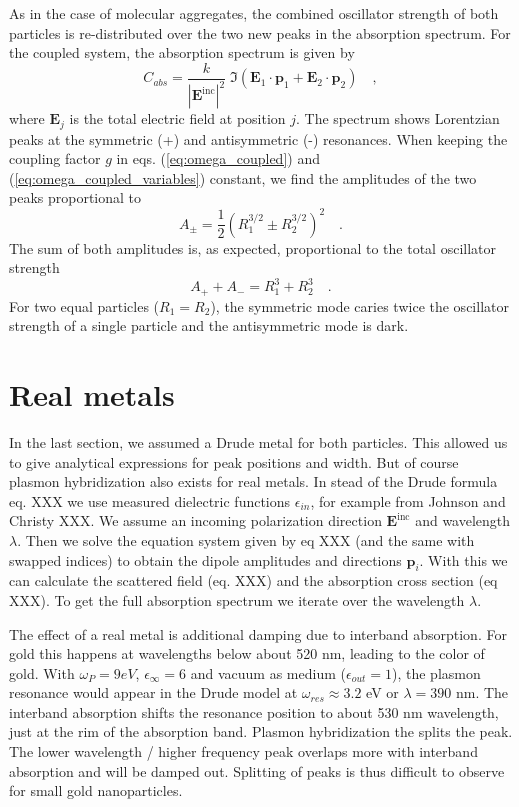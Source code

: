 As in the case of molecular aggregates, the combined oscillator strength of both particles is re-distributed over the two new peaks in the absorption spectrum. 
For
the coupled system, the absorption spectrum is given by  
%
\begin{equation} 
 C_{abs} =  \frac{k}{|\mathbf{E}^{\text{inc}}|^2} \; \Im (\mathbf{E}_1 \cdot \mathbf{p}_1 + \mathbf{E}_2 \cdot \mathbf{p}_2) \quad ,
\end{equation}
%
where $\mathbf{E}_j$ is the total electric field at position $j$. The spectrum shows  Lorentzian
peaks at the symmetric (+) and antisymmetric (-) resonances.  When  keeping the coupling factor $g$ in eqs. (\ref{eq:omega_coupled}) and (\ref{eq:omega_coupled_variables})
constant, we find the  amplitudes of
the two peaks  proportional to 
%
\begin{equation} 
 A_\pm = \frac{1}{2} \left( R_1^{3/2} \pm R_2^{3/2} \right)^2 \quad .
\end{equation}
%
The sum of both amplitudes is, as expected, proportional to the total oscillator
strength
%
\begin{equation} 
 A_+ + A_- = R_1^3 + R_2^3 \quad .
\end{equation}
%
For two equal particles ($R_1 = R_2$), the symmetric mode caries twice the
oscillator strength of a single  particle and the antisymmetric mode
is dark. 


\section{Real metals}

In the last section, we assumed a Drude metal for both particles. This allowed us to give analytical expressions for peak positions and width. But of course plasmon hybridization also exists for real metals. In stead of the Drude formula eq. XXX we use measured dielectric functions $\epsilon_{in}$, for example from Johnson and Christy XXX. We assume an incoming polarization direction $\mathbf{E}^\text{inc}$ and wavelength $\lambda$. Then we solve the equation system given by eq XXX (and the same with swapped indices) to obtain the dipole amplitudes and directions $\mathbf{p}_i$. With this we can calculate the scattered field (eq. XXX) and the absorption cross section (eq XXX). To get the full absorption  spectrum we iterate over the wavelength $\lambda$.


The effect of a real metal is additional damping due to interband absorption. For gold this happens at wavelengths below about 520 nm, leading to the color of gold. With $\omega_P = 9 eV$, $\epsilon_\infty = 6$ and vacuum as medium ($\epsilon_{out} = 1$), the plasmon resonance would appear in the Drude model at $\omega_{res} \approx 3.2$ eV or $\lambda = 390$ nm. The interband absorption shifts the resonance position to about 530 nm wavelength, just at the rim of the absorption band. Plasmon hybridization the splits the peak. The lower wavelength / higher frequency peak overlaps more with interband absorption and will be damped out. Splitting of peaks is thus difficult to observe for small gold nanoparticles.



